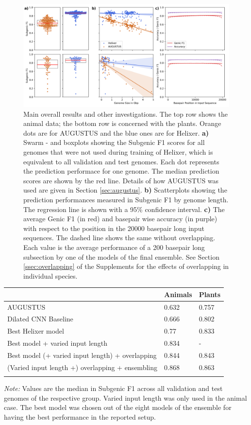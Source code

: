 \documentclass{bioinfo}
\begin{document}
\begin{figure}[!tpb]
\label{fig:main_results}
\centerline{\includegraphics[width=\textwidth]{images/main_results}}
\caption{Main overall results and other investigations. The top row shows the animal
 data; the bottom row is concerned with the plants. Orange dots are for AUGUSTUS and 
the blue ones are for Helixer. {\bf a)} Swarm - and boxplots showing the Subgenic F1 
scores for all genomes that were not used during training of Helixer, which is 
equivalent to all validation and test genomes. Each dot represents the prediction 
performace for one genome. The median prediction scores are shown by the red line. 
Details of how AUGUSTUS was used are given in Section \ref{sec:augustus}. {\bf b)} 
Scatterplots showing the prediction performances measured in Subgenic F1 by genome 
length. The regression line is shown with a 95\% confidence interval. {\bf c)} The 
average Genic F1 (in red) and basepair wise accuracy (in purple) with respect to 
the position in the 20000 basepair long input sequences. The dashed line shows the 
same without overlapping. Each value is the average performance of a 200 basepair 
long subsection by one of the models of the final ensemble. 
See Section \ref{ssec:overlapping} of the 
Supplements for the effects of overlapping in individual species.}
\end{figure}

\begin{table}[!t]
 {
\begin{tabular}{@{}lll@{}}
\toprule & Animals & Plants\\
\midrule
AUGUSTUS & 0.632 & 0.757 \\
Dilated CNN Baseline & 0.666 &  0.802 \\
Best Helixer model & 0.77  & 0.833  \\
Best model + varied input length & 0.834  & - \\
Best model (+ varied input length) + overlapping &  0.844  & 0.843  \\
(Varied input length +) overlapping + ensembling & 0.868  & 0.863  \\
\botrule
\end{tabular}}{{\it Note:} Values are the median in Subgenic F1 across all 
validation and test genomes of the respective group. Varied input length was only 
used in the animal case. The best model was chosen out of the eight models of the 
ensemble for having the best performance in the reported setup.}
\end{table}
\end{document}

